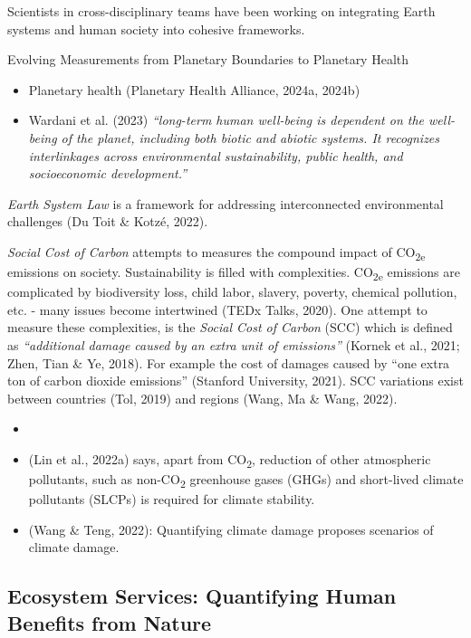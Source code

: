 \documentclass[
  letterpaper,
  DIV=11,
  numbers=noendperiod]{scrartcl}
\begin{document}
Scientists in cross-disciplinary teams have been working on integrating
Earth systems and human society into cohesive frameworks.

Evolving Measurements from Planetary Boundaries to Planetary Health

\begin{itemize}
\item
  Planetary health (Planetary Health Alliance, 2024a, 2024b)
\item
  Wardani et al. (2023) \emph{``long-term human well-being is dependent
  on the well-being of the planet, including both biotic and abiotic
  systems. It recognizes interlinkages across environmental
  sustainability, public health, and socioeconomic development.''}
\end{itemize}

\emph{Earth System Law} is a framework for addressing interconnected
environmental challenges (Du Toit \& Kotzé, 2022).

\emph{Social Cost of Carbon} attempts to measures the compound impact of
CO\textsubscript{2e} emissions on society. Sustainability is filled with
complexities. CO\textsubscript{2e} emissions are complicated by
biodiversity loss, child labor, slavery, poverty, chemical pollution,
etc. - many issues become intertwined (TEDx Talks, 2020). One attempt to
measure these complexities, is the \emph{Social Cost of Carbon} (SCC)
which is defined as \emph{``additional damage caused by an extra unit of
emissions''} (Kornek et al., 2021; Zhen, Tian \& Ye, 2018). For example
the cost of damages caused by ``one extra ton of carbon dioxide
emissions'' (Stanford University, 2021). SCC variations exist between
countries (Tol, 2019) and regions (Wang, Ma \& Wang, 2022).

\begin{itemize}
\item
\item
  (Lin et al., 2022a) says, apart from CO\textsubscript{2}, reduction of
  other atmospheric pollutants, such as non-CO\textsubscript{2}
  greenhouse gases (GHGs) and short-lived climate pollutants (SLCPs) is
  required for climate stability.
\item
  (Wang \& Teng, 2022): Quantifying climate damage proposes scenarios of
  climate damage.
\end{itemize}

\subsection{Ecosystem Services: Quantifying Human Benefits from
Nature}\label{ecosystem-services-quantifying-human-benefits-from-nature}
\end{document}
